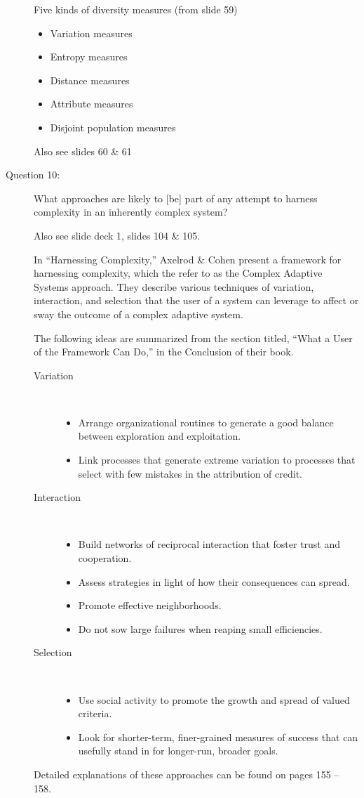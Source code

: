 \documentclass[letterpaper,10pt]{article}
\begin{document}
\begin{description}
Five kinds of diversity measures (from slide 59)
\begin{itemize}
  \item Variation measures
  \item Entropy measures
  \item Distance measures
  \item Attribute measures
  \item Disjoint population measures
\end{itemize}
Also see slides 60 \& 61

\item[Question 10:]
What approaches are likely to [be] part of any attempt to harness complexity in an inherently complex system?

Also see slide deck 1, slides 104 \& 105.

In ``Harnessing Complexity,'' Axelrod \& Cohen present a framework for harnessing complexity, which the refer to as the Complex Adaptive Systems approach.  They describe various techniques of variation, interaction, and selection that the user of a system can leverage to affect or sway the outcome of a complex adaptive system.

The following ideas are summarized from the section titled, ``What a User of the Framework Can Do,'' in the Conclusion of their book.

\begin{description}
  \item[Variation] \ \\
    \begin{itemize}
      \item Arrange organizational routines to generate a good balance between exploration and exploitation.
      \item Link processes that generate extreme variation to processes that select with few mistakes in the attribution of credit.
    \end{itemize}
  \item[Interaction] \ \\
    \begin{itemize}
      \item Build networks of reciprocal interaction that foster trust and cooperation.
      \item Assess strategies in light of how their consequences can spread.
      \item Promote effective neighborhoods.
      \item Do not sow large failures when reaping small efficiencies.
    \end{itemize}
  \item[Selection] \ \\
    \begin{itemize}
      \item Use social activity to promote the growth and spread of valued criteria.
      \item Look for shorter-term, finer-grained measures of success that can usefully stand in for longer-run, broader goals.
    \end{itemize}
\end{description}

Detailed explanations of these approaches can be found on pages 155 -- 158.

\end{description}
\end{document}
